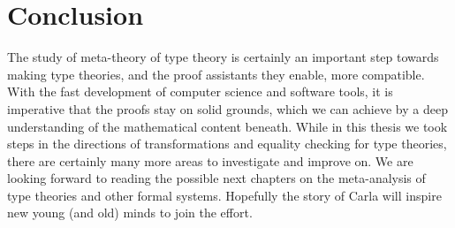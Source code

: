 \chapter{Conclusion}

The study of meta-theory of type theory is certainly an important step towards making type theories, and the proof assistants they enable, more compatible. With the fast development of computer science and software tools, it is imperative that the proofs stay on solid grounds, which we can achieve by a deep understanding of the mathematical content beneath. While in this thesis we took steps in the directions of transformations and equality checking for type theories, there are certainly many more areas to investigate and improve on. We are looking forward to reading the possible next chapters on the meta-analysis of type theories and other formal systems. Hopefully the story of Carla will inspire new young (and old) minds to join the effort.